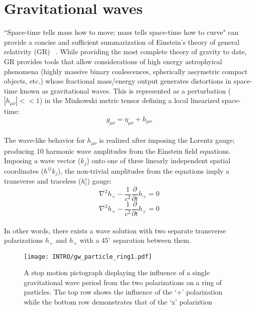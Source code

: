 \section{Gravitational waves}
``Space-time tells mass how to move; mass tells space-time how to curve" can provide a concise and sufficient summarization of Einstein's theory of general relativity (GR) ~\cite{Misner1973}. While providing the most complete theory of gravity to date, GR provides tools that allow considerations of high energy astrophyical phenomena (highly massive binary coalescences, spherically assymetric compact objects, etc.) whose fractional mass/energy output generates distortions in space-time known as gravitational waves. 
This is represented as a perturbation ($|h_{\mu \nu}|<<1$) in the Minkowski metric tensor defining a local linearized space-time:
\\
$$g_{\mu \nu} = \eta_{\mu \nu} + h_{\mu \nu}$$
\\
The wave-like behavior for $h_{\mu \nu}$ is realized after imposing the Lorentz gauge; producing 10 harmonic wave amplitudes from the Einstein field equations. Imposing a wave vector ($k_j$) onto one of three linearly independent spatial coordinates ($h^{ij}k_j$), the non-trivial amplitudes from the equations imply a transverse and traceless ($h^{i}_{i}$) gauge:
\\
$$\nabla^2 h_{+} - \frac{1}{c^2} \frac{\partial}{\partial t} h_{+} = 0$$
$$\nabla^2 h_{\times} - \frac{1}{c^2} \frac{\partial}{\partial t} h_{\times} = 0$$
\\
In other words, there exists a wave solution with two separate transverse polarizations $h_{+}$ and $h_{\times}$ with a $45^{\circ}$ separation between them. 

\begin{figure}[H]
	\texttt{[image: INTRO/gw\_particle\_ring1.pdf]}
	\caption{A stop motion pictograph displaying the influence of a single gravitational wave period from the two polarizations on a ring of particles. The top row shows the influence of the `+' polarization while the bottom row demonstrates that of the `x' polariztion}	

	\label{fig:gw_polarizations}
\end{figure}

